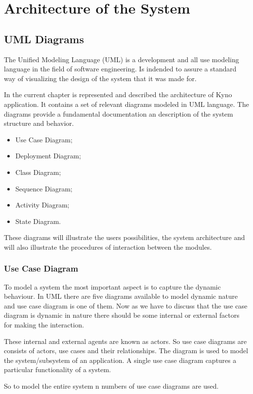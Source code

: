 \section{Architecture of the System}
\subsection{UML Diagrams}
The Unified Modeling Language (UML)\cite{uml} is a development and all use modeling language in the field of software engineering. Is indended to assure a standard way of visualizing the design of the system that it was made for.

In the current chapter is represented and described the architecture of Kyno application. It contains a set of relevant diagrams modeled in UML language. The diagrams provide a fundamental documentation an description of the system structure and behavior.

\begin{itemize}
\item Use Case Diagram;
\item Deployment Diagram;
\item Class Diagram;
\item Sequence Diagram;
\item Activity Diagram;
\item State Diagram.

\end{itemize}
These diagrams will illustrate the users possibilities, the system architecture and will also illustrate the procedures of interaction between the modules.

\subsubsection{Use Case Diagram}
To model a system the most important aspect is to capture the dynamic behaviour. In UML there are five diagrams available to model dynamic nature and use case diagram is one of them. Now as we have to discuss that the use case diagram is dynamic in nature there should be some internal or external factors for making the interaction.

These internal and external agents are known as actors. So use case diagrams are consists of actors, use cases and their relationships. The diagram is used to model the system/subsystem of an application. A single use case diagram captures a particular functionality of a system.

So to model the entire system n numbers of use case diagrams are used.

